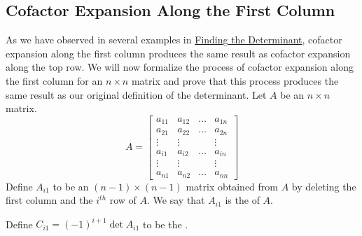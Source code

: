 \documentclass{ximera}
\begin{document}
\subsection*{Cofactor Expansion Along the First Column}
As we have observed in several examples in \href{https://ximera.osu.edu/oerlinalg/LinearAlgebra/DET-0010/main}{Finding the Determinant}, cofactor expansion along the first column produces the same result as cofactor expansion along the top row.  We will now formalize the process of cofactor expansion along the first column for an $n\times n$ matrix and prove that this process produces the same result as our original definition of the determinant.
Let $A$ be an $n\times n$ matrix. 
$$A=\begin{bmatrix}a_{11} & a_{12} & \dots  & a_{1n}  \\
    a_{21} & a_{22} &\dots  & a_{2n}  \\
   \vdots & \vdots &  & \vdots \\
   a_{i1} & a_{i2} & \dots  & a_{in}\\
   \vdots & \vdots &  & \vdots  \\
   a_{n1} & a_{n2} & \dots  & a_{nn}\end{bmatrix}$$
   Define $A_{i1}$ to be an $(n-1)\times (n-1)$ matrix obtained from $A$ by deleting the first column and the $i^{th}$ row of $A$.  We say that $A_{i1}$ is the  of $A$.
\begin{center}
 \end{center} 
Define $C_{i1}=(-1)^{i+1}\det{A_{i1}}$ to be the
 .
\end{document}

